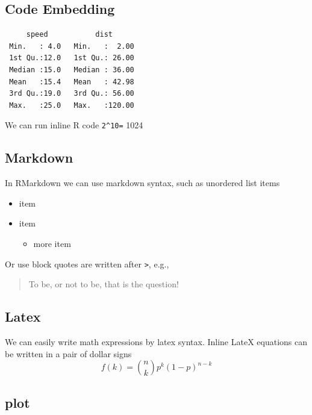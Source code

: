 \documentclass[
]{article}
\providecommand{\tightlist}{%
  \setlength{\itemsep}{0pt}\setlength{\parskip}{0pt}}
\begin{document}
\hypertarget{code-embedding}{%
\subsection{Code Embedding}\label{code-embedding}}

\begin{verbatim}
     speed           dist       
 Min.   : 4.0   Min.   :  2.00  
 1st Qu.:12.0   1st Qu.: 26.00  
 Median :15.0   Median : 36.00  
 Mean   :15.4   Mean   : 42.98  
 3rd Qu.:19.0   3rd Qu.: 56.00  
 Max.   :25.0   Max.   :120.00  
\end{verbatim}

We can run inline R code \texttt{2\^{}10=} 1024

\hypertarget{markdown}{%
\subsection{Markdown}\label{markdown}}

In RMarkdown we can use markdown syntax, such as unordered list items

\begin{itemize}
\tightlist
\item
  item
\item
  item

  \begin{itemize}
  \tightlist
  \item
    more item
  \end{itemize}
\end{itemize}

Or use block quotes are written after \texttt{\textgreater{}}, e.g.,

\begin{quote}
To be, or not to be, that is the question!
\end{quote}

\hypertarget{latex}{%
\subsection{Latex}\label{latex}}

We can easily write math expressions by latex syntax. Inline LateX
equations can be written in a pair of dollar signs
\[f\left(k\right)=\binom{n}{k}p^k\left(1-p\right)^{n-k}\]

\hypertarget{plot}{%
\subsection{plot}\label{plot}}
\end{document}

